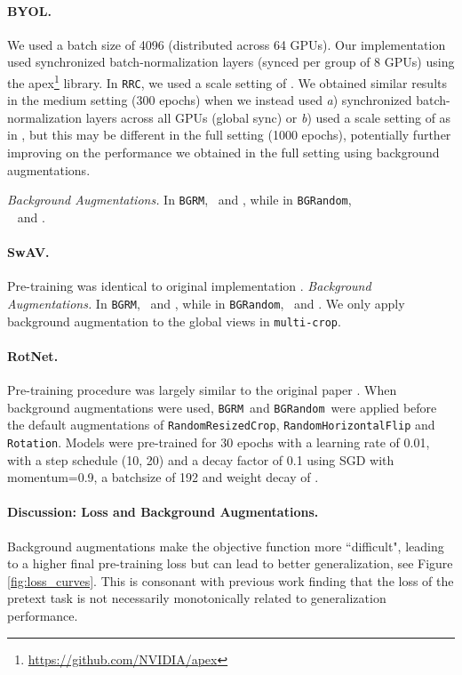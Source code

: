 \documentclass[twoside,11pt]{article}
\newcommand{\bgrm}{\texttt{BG\textunderscore RM}}
\newcommand{\bgrand}{\texttt{BG\textunderscore Random}}
\newcommand{\byol}{BYOL}
\begin{document}
\paragraph{\byol.} We used a batch size of 4096 (distributed across 64 GPUs). Our implementation used synchronized batch-normalization layers (synced per group of 8 GPUs) using the apex\footnote{\url{https://github.com/NVIDIA/apex}} library. In \texttt{RRC}, we used a scale setting of . We obtained similar results in the medium setting (300 epochs) when we instead used  \textit{a}) synchronized batch-normalization layers across all GPUs (global sync) or \textit{b}) used a scale setting of  as in \citep{grill2020bootstrap}, but this may be different in the full setting (1000 epochs), potentially further improving on the performance we obtained in the full setting using background augmentations. 

{\it Background Augmentations.} In \bgrm,~ and , while in \bgrand,\\~ and .

\paragraph{SwAV.} Pre-training was identical to original implementation \citep{swav}. 
{\it Background Augmentations.} In \bgrm,~ and , while in \bgrand,~ and . We only apply background augmentation to the global views in \texttt{multi-crop}.

\paragraph{RotNet.} Pre-training procedure was largely similar to the original paper \citep{gidaris2018unsupervised}.  When background augmentations were used, \bgrm~and \bgrand~were applied before the default augmentations of \texttt{RandomResizedCrop}, \texttt{RandomHorizontalFlip} and \texttt{Rotation}. Models were pre-trained for 30 epochs with a learning rate of 0.01, with a step schedule (10, 20) and a decay factor of 0.1 using SGD with momentum=0.9, a batchsize of 192 and weight decay of .   

\paragraph{Discussion: Loss and Background Augmentations.}
Background augmentations make the objective function more “difficult", leading to a higher final pre-training loss but can lead to better generalization, see Figure \ref{fig:loss_curves}. This is consonant with previous work \citep{he2019moco,kolesnikov_revisiting_2019} finding that the loss of the pretext task is not necessarily monotonically related to generalization performance.
\end{document}
